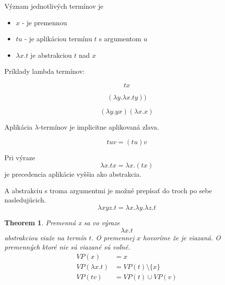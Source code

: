 \documentclass[a4paper,10pt,oneside]{report}%
\newtheorem{theorem}{Theorem}
\begin{document}
Význam jednotlivých termínov je
\begin{itemize}
    \item $x$ - je premennou
    \item $t u$ - je aplikáciou termínu $t$ s argumentom $u$
    \item $\lambda x.t$ je abstrakciou $t$ nad $x$
\end{itemize}

Príklady lambda termínov:

\begin{equation}
    t x
\end{equation}

\begin{equation}
    (\lambda y . \lambda x . t y ))
\end{equation}

\begin{equation}
    (\lambda y.y x) (\lambda x . x)
\end{equation}

Aplikácia $\lambda$-termínov je implicitne aplikovaná zľava.

\begin{equation}
    t u v = ( t u ) v
\end{equation}

Pri výraze
\begin{equation}
    \lambda x . t x = \lambda x . (t x)
\end{equation}
je precedencia aplikácie vyššia ako abstrakcia.

A abstrakciu s troma argumentmi je možné prepísať do troch po sebe nasledujúcich.
\begin{equation}
    \lambda x y z . t = \lambda x . \lambda y . \lambda z . t
\end{equation}

\begin{theorem}
    Premenná x sa vo výraze
    \begin{equation}
        \lambda x . t
    \end{equation}
    abstrakciou viaže na termín $t$. O premennej $x$ hovoríme že je viazaná.
    O premenných ktoré nie sú viazané sú voľné.
    \begin{align*}
        VP(x) &= {x} \\
        VP(\lambda x.t) &= VP(t)  \setminus \{x\} \\
        VP(t v) &= VP(t) \cup VP(v)
    \end{align*}
\end{theorem}
\end{document}
